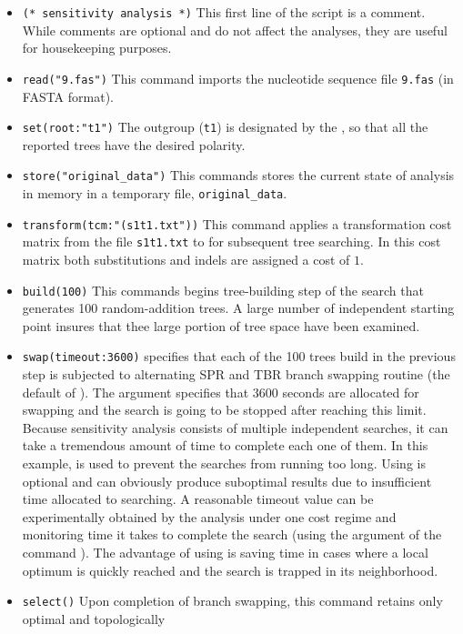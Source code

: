 \begin{itemize}
\item \texttt{(* sensitivity analysis *)} This first line of the script is a comment. While comments are optional and do not
 affect the analyses, they are useful for housekeeping purposes.
\item \texttt{read("9.fas")} This command imports the nucleotide sequence file \texttt{9.fas} (in FASTA format).
\item \texttt{set(root:"t1")} The outgroup (\texttt{t1}) is designated by the , so that all the 
reported trees have the desired polarity.
\item \texttt{store("original\_data")} This commands stores the current state of analysis in memory in a temporary file, 
\texttt{original\_data}.
\item \texttt{transform(tcm:"(s1t1.txt"))} This command applies a transformation cost matrix from the file \texttt{s1t1.txt} to 
for subsequent tree searching. In this cost matrix both substitutions and indels are assigned a cost of $ 1 $.
\item \texttt{build(100)} This commands begins tree-building step of the search that generates 100 random-addition 
trees. A large number of independent starting point insures that thee large portion of tree space have been 
examined.
\item \texttt{swap(timeout:3600)}  specifies that each of the 100 trees build in the previous step is 
subjected to alternating SPR and TBR branch swapping routine (the default of \poy). The argument 
 specifies that 3600 seconds are allocated for swapping and the search is going to be stopped 
after reaching this limit. Because sensitivity analysis consists of multiple independent searches, it can take a 
tremendous amount of time to complete each one of them. In this example,  is used to prevent 
the searches from running too long. Using  is optional and can obviously produce suboptimal 
results due to insufficient time allocated to searching. A reasonable timeout value can be experimentally obtained by 
the analysis under one cost regime and monitoring time it takes to complete the search (using the argument 
 of the command ). The advantage of using  is saving 
time in cases where a local optimum is quickly reached and the search is trapped in its neighborhood.
\item \texttt{select()} Upon completion of branch swapping, this command retains only optimal and topologically 

\end{itemize}
